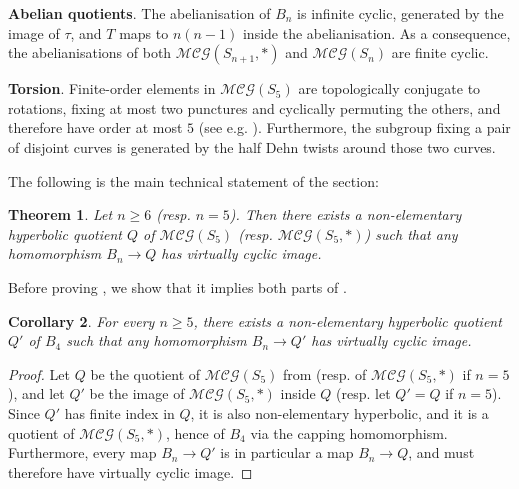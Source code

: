 \documentclass[svgnames]{amsart}
\theoremstyle{plain}
\newtheorem{thm}{Theorem}[section]
\newtheorem{cor}[thm]{Corollary}
\theoremstyle{definition}
\newcommand{\MCG}{\mathcal{MCG}}
\begin{document}
\textbf{Abelian quotients}.  The abelianisation of $B_n$ is infinite cyclic, generated by the image of $\tau$, and $T$ maps to $n(n-1)$ inside the abelianisation. As a consequence, the abelianisations of both $\MCG(S_{n+1},*)$ and $\MCG(S_n)$ are finite cyclic.

\textbf{Torsion}.  Finite-order elements in $\MCG(S_5)$ are topologically conjugate to rotations, fixing at most two punctures and cyclically permuting the others, and therefore have order at most $5$ (see e.g. \cite[Section 7.1.1]{FM_primer}). Furthermore, the subgroup fixing a pair of disjoint curves is generated by the half Dehn twists around those two curves.

The following is the main technical statement of the section:
\begin{thm}\label{thm:ubertheorem}
    Let $n\ge 6$ (resp. $n=5$). Then there exists a non-elementary hyperbolic quotient $Q$ of $\MCG(S_5)$ (resp. $\MCG(S_5,*)$) such that any homomorphism $B_n\to Q$ has virtually cyclic image.
\end{thm}
\noindent Before proving , we show that it implies both parts of .

\begin{cor}\label{cor:uber_for_braids}
    For every $n\ge 5$, there exists a non-elementary hyperbolic quotient $Q'$ of $B_4$ such that any homomorphism $B_n\to Q'$ has virtually cyclic image.
\end{cor}

\begin{proof} Let $Q$ be the quotient of $\MCG(S_5)$ from  (resp. of $\MCG(S_5,*)$ if $n=5$), and let $Q'$ be the image of $\MCG(S_5,*)$ inside $Q$ (resp. let $Q'=Q$ if $n=5$). Since $Q'$ has finite index in $Q$, it is also non-elementary hyperbolic, and it is a quotient of $\MCG(S_5,*)$, hence of $B_4$ via the capping homomorphism. Furthermore, every map $B_n\to Q'$ is in particular a map $B_n\to Q$, and must therefore have virtually cyclic image.
\end{proof}
\end{document}
